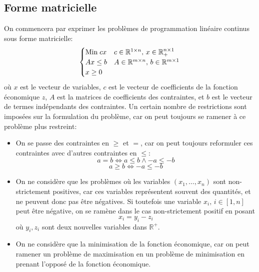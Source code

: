 \documentclass[a4paper]{report}
\theoremstyle{definition}
\theoremstyle{remark}
\theoremstyle{plain}
\begin{document}
\subsection{Forme matricielle}
On commencera par exprimer les problèmes de programmation linéaire continus sous
forme matricielle:
\[\begin{cases}
	\text{Min\;} cx & c\in\mathbb{R}^{1\times n},\, x\in\mathbb{R}^{n\times 1}_+
	\\
	Ax \le b        & A\in\mathbb{R}^{m\times n},\, b\in\mathbb{R}^{m\times 1}
	\\
	x \ge 0
\end{cases}\]
où \(x\) est le vecteur de variables, \(c\) est le vecteur de coefficients de
la fonction économique \(z\), \(A\) est la matrices de coefficients des
contraintes, et \(b\) est le vecteur de termes indépendants des contraintes.
Un certain nombre de restrictions sont imposées sur la formulation du problème,
car on peut toujours se ramener à ce problème plus restreint:
\begin{itemize}
	\item On se passe des contraintes en \(\ge\) et \(=\), car on peut
	toujours reformuler ces contraintes avec d'autres contraintes en \(\le\):
	\[a=b\Leftrightarrow a\le b\land -a\le-b\]
	\[a\ge b\Leftrightarrow -a\le-b\]

	\item On ne considère que les  problèmes où les variables
	\((x_1,\dots,x_n)\) sont non-strictement positives, car ces variables
	représentent souvent des quantités, et ne peuvent donc pas être négatives. Si
	toutefois une variable \(x_i,\,i\in[1,n]\) peut être négative, on se ramène dans
	le cas non-strictement positif en posant
	\[x_i=y_i-z_i\]
	où \(y_i,z_i\) sont deux nouvelles variables dans \(\mathbb{R}^+\).

	\item On ne considère que la minimisation de la fonction
	économique, car on peut ramener un problème de maximisation en un
	problème de minimisation en prenant l'opposé de la fonction économique.
\end{itemize}
\end{document}
